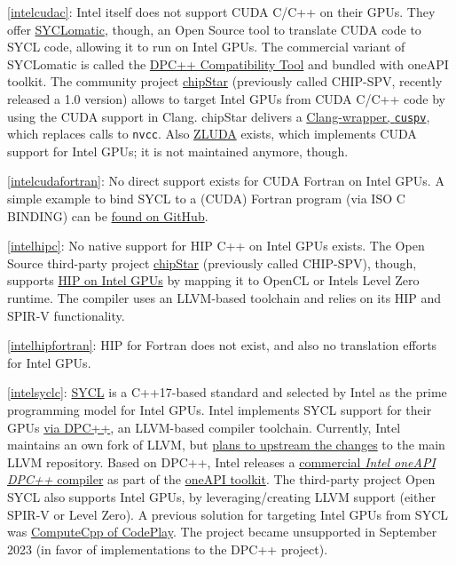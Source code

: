 \item \ref{intelcudac}: Intel itself does not support CUDA C/C++ on their GPUs. They offer \href{https://github.com/oneapi-src/SYCLomatic}{SYCLomatic}, though, an Open Source tool to translate CUDA code to SYCL code, allowing it to run on Intel GPUs. The commercial variant of SYCLomatic is called the \href{https://www.intel.com/content/www/us/en/developer/tools/oneapi/dpc-compatibility-tool.html}{DPC++ Compatibility Tool} and bundled with oneAPI toolkit. The community project \href{https://github.com/CHIP-SPV/chipStar}{chipStar} (previously called CHIP-SPV, recently released a 1.0 version) allows to target Intel GPUs from CUDA C/C++ code by using the CUDA support in Clang. chipStar delivers a \href{https://github.com/CHIP-SPV/chipStar/blob/main/docs/Using.md\#compiling-cuda-application-directly-with-chipstar}{Clang-wrapper, \texttt{cuspv}}, which replaces calls to \texttt{nvcc}. Also \href{https://github.com/vosen/ZLUDA}{ZLUDA} exists, which implements CUDA support for Intel GPUs; it is not maintained anymore, though.
\item \ref{intelcudafortran}: No direct support exists for CUDA Fortran on Intel GPUs. A simple example to bind SYCL to a (CUDA) Fortran program (via ISO C BINDING) can be \href{https://github.com/codeplaysoftware/SYCL-For-CUDA-Examples/tree/master/examples/fortran_interface}{found on GitHub}.
\item \ref{intelhipc}: No native support for HIP C++ on Intel GPUs exists. The Open Source third-party project \href{https://github.com/CHIP-SPV/chipStar}{chipStar} (previously called CHIP-SPV), though, supports \href{https://github.com/CHIP-SPV/chipStar/blob/main/docs/Using.md\#compiling-a-hip-application-using-chipstar}{HIP on Intel GPUs} by mapping it to OpenCL or Intel\textquotesingle s Level Zero runtime. The compiler uses an LLVM-based toolchain and relies on its HIP and SPIR-V functionality.
\item \ref{intelhipfortran}: HIP for Fortran does not exist, and also no translation efforts for Intel GPUs.
\item \ref{intelsyclc}: \href{https://www.khronos.org/sycl/}{SYCL} is a C++17-based standard and selected by Intel as the prime programming model for Intel GPUs. Intel implements SYCL support for their GPUs \href{https://github.com/intel/llvm}{via DPC++}, an LLVM-based compiler toolchain. Currently, Intel maintains an own fork of LLVM, but \href{https://lists.llvm.org/pipermail/cfe-dev/2019-January/060811.html}{plans to upstream the changes} to the main LLVM repository. Based on DPC++, Intel releases a \href{https://www.intel.com/content/www/us/en/developer/tools/oneapi/dpc-compiler.html}{commercial \emph{Intel oneAPI DPC++} compiler} as part of the \href{https://www.intel.com/content/www/us/en/developer/tools/oneapi/toolkits.html}{oneAPI toolkit}. The third-party project Open SYCL also supports Intel GPUs, by leveraging/creating LLVM support (either SPIR-V or Level Zero). A previous solution for targeting Intel GPUs from SYCL was \href{https://developer.codeplay.com/products/computecpp/ce/home/}{ComputeCpp of CodePlay}. The project became unsupported in September 2023 (in favor of implementations to the DPC++ project).
